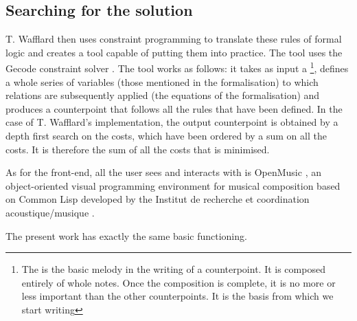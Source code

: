 \subsection{Searching for the solution}
T. Wafflard then uses constraint programming to translate these rules of formal logic and creates a tool capable of putting them into practice. The tool uses the Gecode constraint solver \cite{Gecode}. The tool works as follows: it takes as input a \cf\footnote{The \cfs is the basic melody in the writing of a counterpoint. It is composed entirely of whole notes. Once the composition is complete, it is no more or less important than the other counterpoints. It is the basis from which we start writing}, defines a whole series of variables (those mentioned in the formalisation) to which relations are subsequently applied (the equations of the formalisation) and produces a counterpoint that follows all the rules that have been defined. In the case of T. Wafflard's implementation, the output counterpoint is obtained by a depth first search on the costs, which have been ordered by a sum on all the costs. It is therefore the sum of all the costs that is minimised.

As for the front-end, all the user sees and interacts with is OpenMusic \cite{OpenMusic}, an object-oriented visual programming environment for musical composition based on Common Lisp \cite{commonlisp} developed by the Institut de recherche et coordination acoustique/musique \cite{IRCAM}.

The present work has exactly the same basic functioning. 


